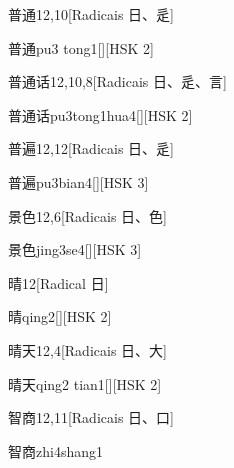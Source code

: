 \begin{entry}{普通}{12,10}[Radicais ⽇、⾡]
  \begin{phonetics}{普通}{pu3 tong1}[][HSK 2]
  \end{phonetics}
\end{entry}

\begin{entry}{普通话}{12,10,8}[Radicais ⽇、⾡、⾔]
  \begin{phonetics}{普通话}{pu3tong1hua4}[][HSK 2]
  \end{phonetics}
\end{entry}

\begin{entry}{普遍}{12,12}[Radicais ⽇、⾡]
  \begin{phonetics}{普遍}{pu3bian4}[][HSK 3]
  \end{phonetics}
\end{entry}

\begin{entry}{景色}{12,6}[Radicais ⽇、⾊]
  \begin{phonetics}{景色}{jing3se4}[][HSK 3]
  \end{phonetics}
\end{entry}

\begin{entry}{晴}{12}[Radical ⽇]
  \begin{phonetics}{晴}{qing2}[][HSK 2]
  \end{phonetics}
\end{entry}

\begin{entry}{晴天}{12,4}[Radicais ⽇、⼤]
  \begin{phonetics}{晴天}{qing2 tian1}[][HSK 2]
  \end{phonetics}
\end{entry}

\begin{entry}{智商}{12,11}[Radicais ⽇、⼝]
  \begin{phonetics}{智商}{zhi4shang1}
  \end{phonetics}
\end{entry}

